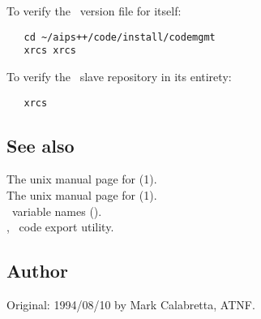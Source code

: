 To verify the \rcs\ version file for  itself:

\begin{verbatim}
   cd ~/aips++/code/install/codemgmt
   xrcs xrcs
\end{verbatim}

To verify the \aipspp\ slave repository in its entirety:

\begin{verbatim}
   xrcs
\end{verbatim}

\subsection*{See also}

The unix manual page for (1).\\
The unix manual page for (1).\\
\aipspp\ variable names ().\\
, \aipspp\ code export utility.

\subsection*{Author}

Original: 1994/08/10 by Mark Calabretta, ATNF.
